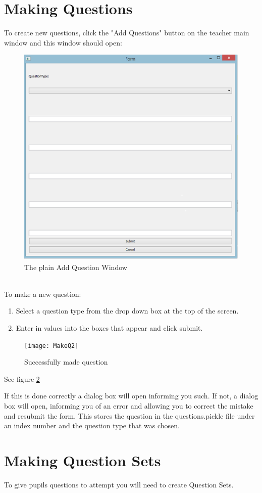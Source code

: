 \documentclass{report}
\begin{document}
\section{Making Questions}
To create new questions, click the "Add Questions" button on the teacher main window and this window should open:
\begin{figure}[h]
\centering
\includegraphics{MakeQ}
\caption{The plain Add Question Window}
\label{fig:my_label}
\end{figure}\\
\bigskip
To make a new question:
\begin{enumerate}
\item{Select a question type from the drop down box at the top of the screen.}
 \item{Enter in values into the boxes that appear and click submit.}
\end{enumerate}
\begin{figure}
\centering
\centerline{\texttt{[image: MakeQ2]}}
\caption{Successfully made question}
\label{fig:makeQ2}
\end{figure}

See figure \ref{fig:makeQ2}

If this is done correctly a dialog box will open informing you such. If not, a dialog box will open, informing you of an error and allowing you to correct the mistake and resubmit the form.
This stores the question in the questions.pickle file under an index number and the question type that was chosen.
\section{Making Question Sets}
To give pupils questions to attempt you will need to create Question Sets.
\end{document}
